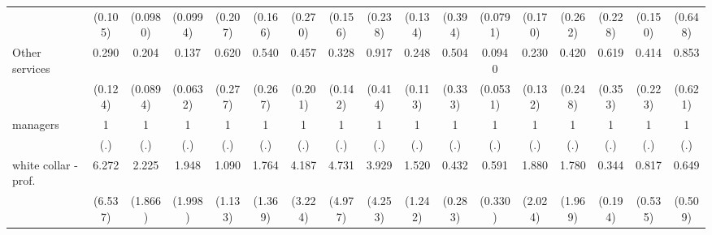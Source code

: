 {\begin{tabular}{l*{16}{c}}
                    &     (0.105)         &    (0.0980)         &    (0.0994)         &     (0.207)         &     (0.166)         &     (0.270)         &     (0.156)         &     (0.238)         &     (0.134)         &     (0.394)         &    (0.0791)         &     (0.170)         &     (0.262)         &     (0.228)         &     (0.150)         &     (0.648)         \\
[1em]
Other services      &       0.290\sym{**} &       0.204\sym{***}&       0.137\sym{***}&       0.620         &       0.540         &       0.457         &       0.328\sym{*}  &       0.917         &       0.248\sym{**} &       0.504         &      0.0940\sym{***}&       0.230\sym{*}  &       0.420         &       0.619         &       0.414         &       0.853         \\
                    &     (0.124)         &    (0.0894)         &    (0.0632)         &     (0.277)         &     (0.267)         &     (0.201)         &     (0.142)         &     (0.414)         &     (0.113)         &     (0.333)         &    (0.0531)         &     (0.132)         &     (0.248)         &     (0.353)         &     (0.223)         &     (0.621)         \\
[1em]
managers            &           1         &           1         &           1         &           1         &           1         &           1         &           1         &           1         &           1         &           1         &           1         &           1         &           1         &           1         &           1         &           1         \\
                    &         (.)         &         (.)         &         (.)         &         (.)         &         (.)         &         (.)         &         (.)         &         (.)         &         (.)         &         (.)         &         (.)         &         (.)         &         (.)         &         (.)         &         (.)         &         (.)         \\
[1em]
white collar - prof.&       6.272         &       2.225         &       1.948         &       1.090         &       1.764         &       4.187         &       4.731         &       3.929         &       1.520         &       0.432         &       0.591         &       1.880         &       1.780         &       0.344         &       0.817         &       0.649         \\
                    &     (6.537)         &     (1.866)         &     (1.998)         &     (1.133)         &     (1.369)         &     (3.224)         &     (4.977)         &     (4.253)         &     (1.242)         &     (0.283)         &     (0.330)         &     (2.024)         &     (1.969)         &     (0.194)         &     (0.535)         &     (0.509)         \\

\end{tabular}}
